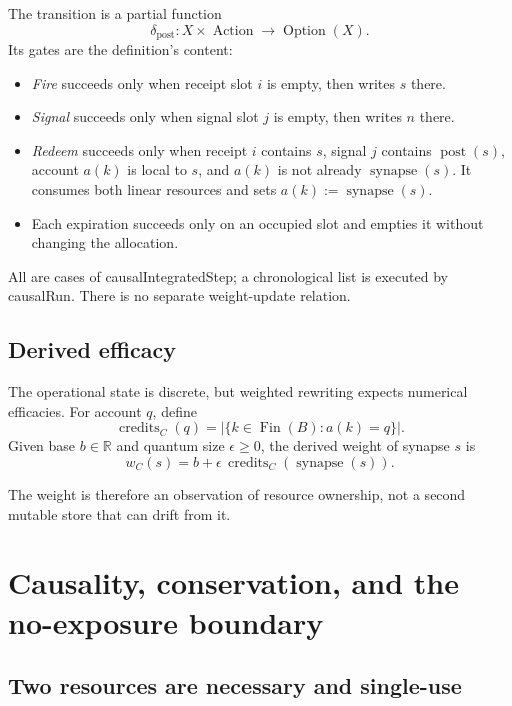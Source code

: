 \documentclass[11pt]{article}
\newcommand{\Fin}{\operatorname{Fin}}
\newcommand{\Option}{\operatorname{Option}}
\newcommand{\post}{\operatorname{post}}
\newcommand{\synapse}{\operatorname{synapse}}
\newcommand{\Credits}{\operatorname{credits}}
\newcommand{\leanname}[1]{{\scriptsize\ttfamily
  \def\_{\textunderscore\allowbreak}#1}}
\begin{document}
The transition is a partial function
\[
  \delta_{\post}:X\times\operatorname{Action}\longrightarrow\Option(X).
\]
Its gates are the definition's content:

\begin{itemize}
\item \emph{Fire} succeeds only when receipt slot $i$ is empty, then writes
  $s$ there.
\item \emph{Signal} succeeds only when signal slot $j$ is empty, then writes
  $n$ there.
\item \emph{Redeem} succeeds only when receipt $i$ contains $s$, signal $j$
  contains $\post(s)$, account $a(k)$ is local to $s$, and $a(k)$ is not
  already $\synapse(s)$.  It consumes both linear resources and sets
  $a(k):=\synapse(s)$.
\item Each expiration succeeds only on an occupied slot and empties it without
  changing the allocation.
\end{itemize}

All are cases of \leanname{causalIntegratedStep}; a chronological list is
executed by \leanname{causalRun}.  There is no separate weight-update
relation.

\subsection{Derived efficacy}

The operational state is discrete, but weighted rewriting expects numerical
efficacies.  For account $q$, define
\[
  \Credits_C(q)=\left|\{k\in\Fin(B):a(k)=q\}\right|.
\]
Given base $b\in\mathbb{R}$ and quantum size $\epsilon\geq0$, the derived
weight of synapse $s$ is
\[
  w_C(s)=b+\epsilon\,\Credits_C(\synapse(s)).
\]

The weight is therefore an observation of resource ownership, not a second
mutable store that can drift from it.

\section{Causality, conservation, and the no-exposure boundary}
\label{sec:laws}

\subsection{Two resources are necessary and single-use}
\end{document}
